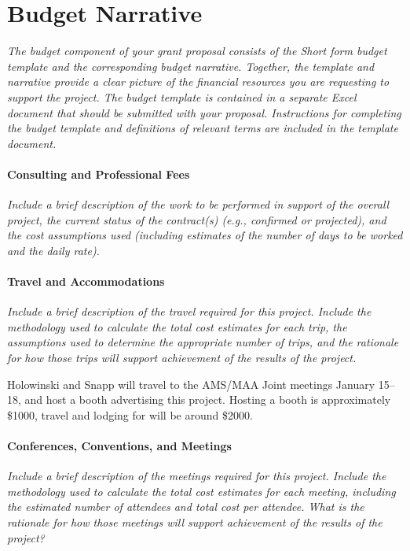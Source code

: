 \section{Budget Narrative}

\textsl{The budget component of your grant proposal consists of the
  Short form budget template and the corresponding budget
  narrative. Together, the template and narrative provide a clear
  picture of the financial resources you are requesting to support the
  project. The budget template is contained in a separate Excel
  document that should be submitted with your proposal. Instructions
  for completing the budget template and definitions of relevant terms
  are included in the template document.}

\paragraph{Consulting and Professional Fees}
\textsl{Include a brief description of the work to be performed in
  support of the overall project, the current status of the
  contract(s) (e.g., confirmed or projected), and the cost assumptions
  used (including estimates of the number of days to be worked and the
  daily rate).}


\paragraph{Travel and Accommodations}
\textsl{Include a brief description of the travel required for this
  project.  Include the methodology used to calculate the total cost
  estimates for each trip, the assumptions used to determine the
  appropriate number of trips, and the rationale for how those trips
  will support achievement of the results of the project.}

\vspace{\topsep}

Holowinski and Snapp will travel to the AMS/MAA Joint meetings January
15--18, and host a booth advertising this project.  Hosting a booth is
approximately \$1000, travel and lodging for will be around \$2000.


\paragraph{Conferences, Conventions, and Meetings}
\textsl{Include a brief description of the meetings required for this
  project. Include the methodology used to calculate the total cost
  estimates for each meeting, including the estimated number of
  attendees and total cost per attendee. What is the rationale for how
  those meetings will support achievement of the results of the
  project?}

